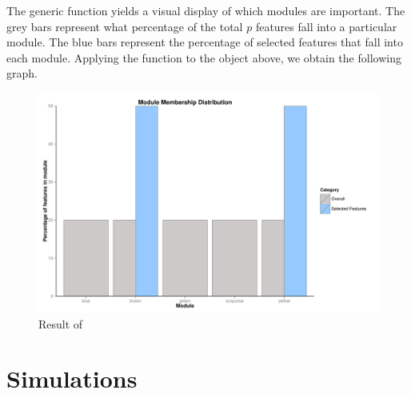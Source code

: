\documentclass[article,shortnames]{jss}
\begin{document}
The generic function  yields a visual display of which modules are important.  The grey bars
represent what percentage of the total $p$ features fall into a particular module.  The blue bars represent
the percentage of selected features that fall into each module.  Applying the function  to the
object  above, we obtain the following graph.
\begin{figure}
\caption{Result of } 
\includegraphics{ch3plot}
\end{figure}
\section{Simulations}


  






     



     
    


\end{document}
